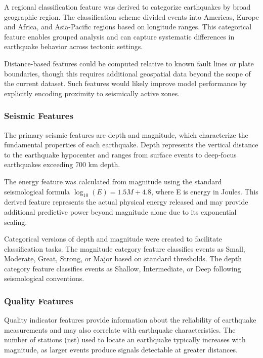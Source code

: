 A regional classification feature was derived to categorize earthquakes by broad geographic region. The classification scheme divided events into Americas, Europe and Africa, and Asia-Pacific regions based on longitude ranges. This categorical feature enables grouped analysis and can capture systematic differences in earthquake behavior across tectonic settings.

Distance-based features could be computed relative to known fault lines or plate boundaries, though this requires additional geospatial data beyond the scope of the current dataset. Such features would likely improve model performance by explicitly encoding proximity to seismically active zones.

\subsubsection{Seismic Features}

The primary seismic features are depth and magnitude, which characterize the fundamental properties of each earthquake. Depth represents the vertical distance to the earthquake hypocenter and ranges from surface events to deep-focus earthquakes exceeding 700 km depth.

The energy feature was calculated from magnitude using the standard seismological formula $\log_{10}(E) = 1.5M + 4.8$, where E is energy in Joules. This derived feature represents the actual physical energy released and may provide additional predictive power beyond magnitude alone due to its exponential scaling.

Categorical versions of depth and magnitude were created to facilitate classification tasks. The magnitude category feature classifies events as Small, Moderate, Great, Strong, or Major based on standard thresholds. The depth category feature classifies events as Shallow, Intermediate, or Deep following seismological conventions.

\subsubsection{Quality Features}

Quality indicator features provide information about the reliability of earthquake measurements and may also correlate with earthquake characteristics. The number of stations (nst) used to locate an earthquake typically increases with magnitude, as larger events produce signals detectable at greater distances.

